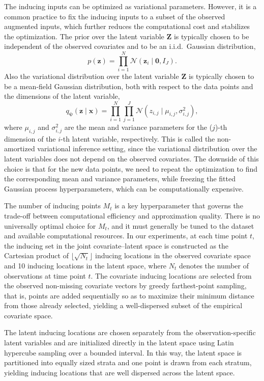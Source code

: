 The 
inducing inputs can be optimized as variational parameters. However, it is a common 
practice to fix the inducing inputs to a subset of the observed augmented inputs,
which further reduces the computational cost and stabilizes the optimization. The prior 
over the latent variable \(\mathbf{Z}\) is typically chosen to 
be independent of the observed covariates and to be an i.i.d.\ Gaussian distribution,
\[
p(\mathbf{z}) = \prod_{i=1}^N \mathcal{N}(\mathbf{z}_i \mid \mathbf{0}, I_J).
\]
Also the variational distribution over the latent variable \(\mathbf{Z}\) is 
typically chosen to be a mean-field Gaussian distribution, both with respect to 
the data points and the dimensions of the latent variable,
\[
q_{\boldsymbol{\psi}}(\mathbf{z}\mid \mathbf{x}) = \prod_{i=1}^N \prod_{j=1}^J \mathcal{N}(z_{i,j} \mid \mu_{i,j}, \sigma_{i,j}^2),
\]
where \(\mu_{i,j}\) and \(\sigma_{i,j}^2\) are 
the mean and variance parameters for the (\(j\))-th dimension of the \(i\)-th 
latent variable, respectively. 
This 
is called the non-amortized variational inference setting, 
since the variational distribution over the latent variables does not depend on the observed covariates. 
The downside of this 
choice is that for the new data points, 
we need to repeat the optimization to find the corresponding mean and variance parameters, while 
freezing the fitted Gaussian process hyperparameters, 
which can be computationally expensive.

The number of inducing points \(M_t\) is a key hyperparameter that governs 
the trade-off between computational efficiency and approximation quality. 
There is no universally optimal choice for \(M_t\), and it must generally be 
tuned to the dataset and available computational resources. In our experiments, 
at each time point \(t\), the inducing set in the joint covariate--latent space is 
constructed as the Cartesian product of \(\lfloor \sqrt{N_t} \rfloor\) inducing 
locations in the observed covariate space and 10 inducing locations in the latent 
space, where \(N_t\) denotes the number of observations at time point \(t\). 
The covariate inducing locations are selected from the observed non-missing covariate 
vectors by greedy farthest-point sampling, that is, points are added sequentially so as 
to maximize their minimum distance from those already selected, yielding a 
well-dispersed subset of the empirical covariate space. 

The latent inducing locations 
are chosen separately from the observation-specific latent variables and are initialized 
directly in the latent space using Latin hypercube sampling over a bounded interval. In 
this way, the latent space is 
partitioned into equally sized strata and 
one point is drawn from each stratum, 
yielding inducing locations that are well dispersed across the latent space. 
